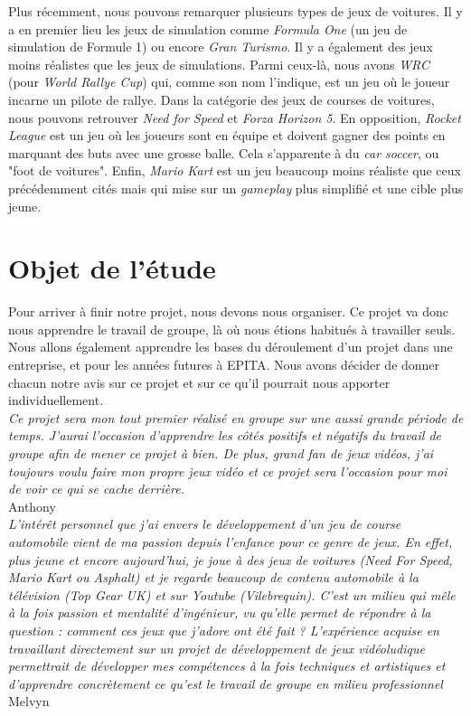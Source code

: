 \documentclass[11pt,a4paper]{article}
\begin{document}
  \indent Plus récemment, nous pouvons remarquer plusieurs types de jeux de voitures. Il y a en premier lieu 
  les jeux de simulation comme \textit{Formula One} (un jeu de simulation de Formule 1) ou encore 
  \textit{Gran Turismo}. Il y a également des jeux moins réalistes
  que les jeux de simulations. Parmi ceux-là, nous avons \textit{WRC} (pour \textit{World Rallye Cup})
  qui, comme son nom l'indique, est un jeu où le joueur incarne un pilote de rallye. Dans la 
  catégorie des jeux de courses de voitures, nous pouvons retrouver 
  \textit{Need for Speed} et \textit{Forza Horizon 5}.
  En opposition, \textit{Rocket League} est un jeu où les joueurs sont en équipe  et doivent gagner des
  points en marquant des buts avec une grosse balle. Cela s'apparente à du \textit{car soccer}, ou "foot
  de voitures".
  Enfin, \textit{Mario Kart} est un jeu beaucoup moins réaliste
  que ceux précédemment cités mais qui mise sur un \textit{gameplay} plus simplifié et une cible plus jeune. 
 \clearpage

\section{Objet de l'étude}
  Pour arriver à finir notre projet, nous devons nous organiser.
  Ce projet va donc nous apprendre le travail de groupe, là où nous étions habitués à travailler seuls. 
  Nous allons également apprendre les bases du déroulement d'un projet dans une entreprise, 
  et pour les années futures à EPITA. Nous avons décider de donner chacun notre avis sur ce projet et sur ce 
  qu'il pourrait nous apporter individuellement.\\

  \textit{Ce projet sera mon tout premier réalisé en groupe sur une aussi grande période de temps. 
    J'aurai l'occasion d'apprendre les côtés positifs et négatifs du travail de groupe afin de mener ce 
    projet à bien. De plus, grand fan de jeux vidéos, j'ai toujours voulu faire mon propre jeux vidéo et ce 
    projet sera l'occasion pour moi de voir ce qui se cache derrière.} \\
  \indent Anthony\\

  \textit{L'intérêt personnel que j'ai envers le développement d'un jeu de course automobile vient de ma 
    passion depuis l'enfance pour ce genre de jeux. En effet, plus jeune et encore aujourd'hui, je joue
    à des jeux de voitures (Need For Speed, Mario Kart ou Asphalt) et je regarde beaucoup de contenu automobile
    à la télévision (Top Gear UK) et sur Youtube (Vilebrequin). C'est un milieu qui mêle à la fois passion et 
    mentalité d'ingénieur, vu qu'elle permet de répondre à la question : comment ces jeux que j'adore ont été 
    fait ? L'expérience acquise en travaillant directement sur un projet de développement de jeux vidéoludique 
    permettrait de développer mes compétences à la fois techniques et artistiques et d'apprendre concrètement 
    ce qu'est le travail de groupe en milieu professionnel} \\
  \indent Melvyn\\
\end{document}
